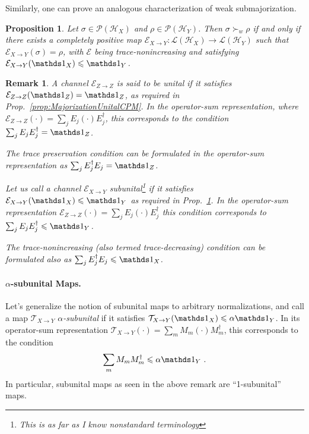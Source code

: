 \documentclass[10pt,letterpaper]{article}
\theoremstyle{plain}
\newtheorem{prop}[thm]{Proposition}
\newtheorem{remark}[thm]{Remark}
\def\Hs{\mathscr{H}}%
\newcommand{\LOps}{\mathscr{L}}
\newcommand{\POps}{\mathscr{P}}
\begin{document}
Similarly, one can prove an analogous characterization of weak submajorization.
\begin{prop}
  \label{prop:WeakSubMajorizationSubUnitalCPM}
  Let $\sigma\in\POps(\Hs_X)$ and $\rho\in\POps(\Hs_Y)$. Then $\sigma\succ_w\rho$ if and only if
  there exists a completely positive map $\mathcal{E}_{X\rightarrow Y} : \LOps(\Hs_X)\rightarrow\LOps(\Hs_Y)$
  such that $\mathcal{E}_{X\rightarrow Y}(\sigma) = \rho$, with $\mathcal{E}$ being trace-nonincreasing and
  satisfying $\mathcal{E}_{X\rightarrow Y}(\Ident_X)\leqslant \Ident_Y$.
\end{prop}

\begin{remark}
  \label{rem:AboutUnitalCPMs}
  A channel $\mathcal{E}_{Z\rightarrow Z}$ is said to be {\em unital} if it satisfies
  $\mathcal{E}_{Z\rightarrow Z}(\Ident_Z) = \Ident_Z$, as required in Prop.~\ref{prop:MajorizationUnitalCPM}. In
  the operator-sum representation, where
  $\mathcal{E}_{Z\rightarrow Z}(\cdot) = \sum_j E_j\left(\cdot\right)E_j^\dagger$, this corresponds to the condition
  $\sum_j E_j E_j^\dagger = \Ident_Z$.

  The trace preservation condition can be formulated in the operator-sum representation as
  $\sum_j E_j^\dagger E_j = \Ident_Z$.

  Let us call a channel $\mathcal{E}_{X\rightarrow Y}$ {\em subunital}\footnote{This is as far as I know
    nonstandard terminology} if it satisfies $\mathcal{E}_{X\rightarrow Y}(\Ident_X) \leqslant \Ident_Y$ as
  required in Prop.~\ref{prop:WeakSubMajorizationSubUnitalCPM}. In the operator-sum representation
  $\mathcal{E}_{Z\rightarrow Z}(\cdot) = \sum_j E_j\left(\cdot\right)E_j^\dagger$ this condition corresponds
  to $\sum_j E_j E_j^\dagger \leqslant \Ident_Y$.

  The trace-nonincreasing (also termed trace-decreasing) condition can be formulated also as
  $\sum_j E_j^\dagger E_j \leqslant \Ident_X$.
\end{remark}

\paragraph{$\alpha$-subunital Maps.} Let's generalize the notion of subunital maps to arbitrary normalizations,
and call a map $\mathcal{T}_{X\rightarrow Y}$ {\em $\alpha$-subunital} if it satisfies
$\mathcal{T}_{X\rightarrow Y}(\Ident_X) \leqslant \alpha \Ident_Y$. In its operator-sum representation
$\mathcal{T}_{X\rightarrow Y}(\cdot) = \sum_m M_m \left(\cdot\right) M_m^\dagger$, this corresponds to the
condition
\begin{align}
  \label{eq:lambdaSubUnital}
  \sum_m M_m M_m^\dagger \leqslant \alpha \Ident_Y\ .
\end{align}
In particular, subunital maps as seen in the above remark are ``1-subunital'' maps.
\end{document}

